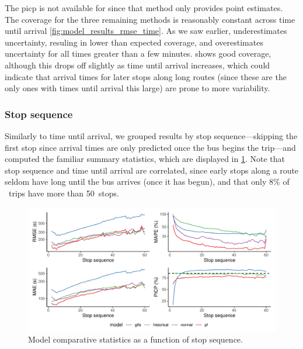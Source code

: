 The \gls{picp} is not available for \Fsched{} since that method only provides point estimates. The coverage for the three remaining methods is reasonably constant across time until arrival \cref{fig:model_results_rmse_time}. As we saw earlier, \Fpf{} underestimates uncertainty, resuling in lower than expected coverage, and \Fnorm{} overestimates uncertainty for all times greater than a few minutes. \Fhist{} shows good coverage, although this drops off slightly as time until arrival increases, which could indicate that arrival times for later stops along long routes (since these are the only ones with times until arrival this large) are prone to more variability.




\subsubsection{Stop sequence}

Similarly to time until arrival, we grouped results by stop sequence---skipping the first stop since arrival times are only predicted once the bus begins the trip---and computed the familiar summary statistics, which are displayed in \cref{fig:model_results_rmse_stopn}. Note that stop sequence and time until arrival are correlated, since early stops along a route seldom have long until the bus arrives (once it has begun), and that only 8\% of ~trips have more than 50~stops.


\begin{knitrout}\small
{}\color{fgcolor}\begin{figure}
\includegraphics[width=\textwidth]{figure/model_results_rmse_stopn-1} \caption[Model comparative statistics as a function of stop sequence]{Model comparative statistics as a function of stop sequence.}\label{fig:model_results_rmse_stopn}
\end{figure}


\end{knitrout}

